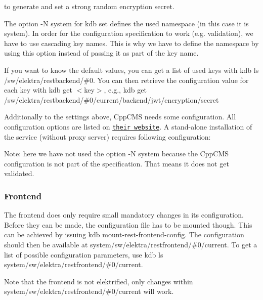 to generate and set a strong random encryption secret.

The option {\ttfamily -\/N system} for {\ttfamily kdb set} defines the used namespace (in this case it is {\ttfamily system}). In order for the configuration specification to work (e.\+g. validation), we have to use cascading key names. This is why we have to define the namespace by using this option instead of passing it as part of the key name.

If you want to know the default values, you can get a list of used keys with {\ttfamily kdb ls /sw/elektra/restbackend/\#0}. You can then retrieve the configuration value for each key with {\ttfamily kdb get $<$key$>$}, e.\+g., {\ttfamily kdb get /sw/elektra/restbackend/\#0/current/backend/jwt/encryption/secret}

Additionally to the settings above, Cpp\+C\+MS needs some configuration. All configuration options are listed on \href{http://cppcms.com/wikipp/en/page/cppcms_1x_config}{\tt their website}. A stand-\/alone installation of the service (without proxy server) requires following configuration\+:




Note\+: here we have not used the option {\ttfamily -\/N system} because the Cpp\+C\+MS configuration is not part of the specification. That means it does not get validated.

\subsubsection*{Frontend}

The frontend does only require small mandatory changes in its configuration. Before they can be made, the configuration file has to be mounted though. This can be achieved by issuing {\ttfamily kdb mount-\/rest-\/frontend-\/config}. The configuration should then be available at {\ttfamily system/sw/elektra/restfrontend/\#0/current}. To get a list of possible configuration parameters, use {\ttfamily kdb ls system/sw/elektra/restfrontend/\#0/current}.

Note that the frontend is not elektrified, only changes within {\ttfamily system/sw/elektra/restfrontend/\#0/current} will work.

